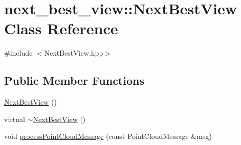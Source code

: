 \hypertarget{classnext__best__view_1_1NextBestView}{\section{next\-\_\-best\-\_\-view\-:\-:\-Next\-Best\-View \-Class \-Reference}
\label{classnext__best__view_1_1NextBestView}
}


{\ttfamily \#include $<$\-Next\-Best\-View.\-hpp$>$}

\subsection*{\-Public \-Member \-Functions}
\begin{DoxyCompactItemize}
\item 
\hyperlink{classnext__best__view_1_1NextBestView_a91abd326ff4679e445766aab4682ef25}{\-Next\-Best\-View} ()
\item 
virtual \hyperlink{classnext__best__view_1_1NextBestView_afb426631c93ddb9422fd2eda674556e3}{$\sim$\-Next\-Best\-View} ()
\item 
void \hyperlink{classnext__best__view_1_1NextBestView_af5530bc9c8cc1a22e31131c2c8b0388e}{process\-Point\-Cloud\-Message} (const \-Point\-Cloud\-Message \&msg)
\end{DoxyCompactItemize}


